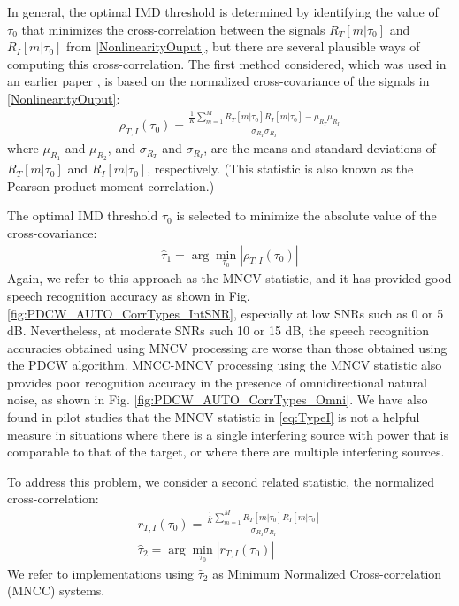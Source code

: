 \documentclass{article}
\begin{document}
In general, the optimal IMD threshold is determined by identifying the value of $\tau_0$ that minimizes the cross-correlation between the signals $R_T[m|\tau_0]$ and $R_I[m|\tau_0]$ from  \eqref{NonlinearityOuput}, but there are several plausible ways of computing this cross-correlation.  The first method considered, which was used in an earlier paper \cite{C_Kim_INTERSPEECH_2010_1}, is based on 
the normalized cross-covariance of the signals in  \eqref{NonlinearityOuput}:
\begin{align}
    \rho_{T,I}(\tau_0) = \frac{\frac{1}{K}\sum_{m=1}^{M} R_T[m|\tau_0]  R_I[m|\tau_0] - \mu_{R_T}\mu_{R_I}}{\sigma_{R_T} \sigma_{R_I}}
    \label{eq:TypeI}
\end{align}
where $\mu_{R_1}$ and $\mu_{R_2}$, and $\sigma_{R_T}$ and $\sigma_{R_I}$, are the means and standard deviations of $R_T[m|\tau_0]$ and $R_I[m|\tau_0]$, respectively.  (This statistic   is also known as the Pearson product-moment correlation.) 

The optimal IMD threshold $\tau_0$ is selected to minimize the absolute value
of the cross-covariance:
\begin{align}
    \hat{\tau}_1 = \arg \min_{\tau_0} |\rho_{T,I}(\tau_0)| \label{eq:minCrossCor}
\end{align}
 Again, we refer to this approach
as the MNCV statistic, and 
  it has provided good speech recognition accuracy as shown in Fig. \ref{fig:PDCW_AUTO_CorrTypes_IntSNR}, especially at low SNRs such as 0 or 5 dB. Nevertheless, at moderate SNRs such 10   or 15 dB, the speech recognition accuracies obtained using MNCV processing are   worse than those obtained using the PDCW algorithm.  MNCC-MNCV processing using the MNCV statistic also provides poor recognition accuracy in the presence of omnidirectional 
natural noise, as   shown in Fig. \ref{fig:PDCW_AUTO_CorrTypes_Omni}. 
We have also found in pilot studies that the MNCV statistic in  \eqref{eq:TypeI} is not a helpful measure in situations where there is a single interfering source with power that is comparable to that of the target, or where there are multiple interfering sources.  

To address this problem, we consider a second related statistic,    the   normalized cross-correlation:
\begin{align}
    r_{T,I}(\tau_0)  = \frac{\frac{1}{K}\sum_{m=1}^{M} R_T[m|\tau_0]  R_I[m|\tau_0]}{\sigma_{R_T} \sigma_{R_I}} \\
    \hat{\tau}_2  = \arg \min_{\tau_0} | r_{T,I}(\tau_0) |
\end{align}
We refer to implementations using $\hat{\tau}_2$   as Minimum Normalized Cross-correlation (MNCC) systems.
 
\end{document}
